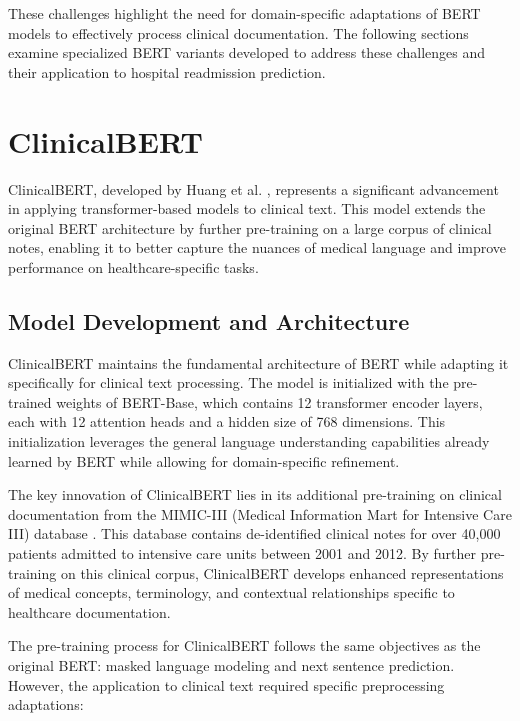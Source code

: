 \documentclass[3p,times,procedia]{elsarticle}
\begin{document}
These challenges highlight the need for domain-specific adaptations of BERT models to effectively process clinical documentation. The following sections examine specialized BERT variants developed to address these challenges and their application to hospital readmission prediction.

\section{ClinicalBERT}\label{clinical_bert}

ClinicalBERT, developed by Huang et al. \cite{Huang2020}, represents a significant advancement in applying transformer-based models to clinical text. This model extends the original BERT architecture by further pre-training on a large corpus of clinical notes, enabling it to better capture the nuances of medical language and improve performance on healthcare-specific tasks.

\subsection{Model Development and Architecture}

ClinicalBERT maintains the fundamental architecture of BERT while adapting it specifically for clinical text processing. The model is initialized with the pre-trained weights of BERT-Base, which contains 12 transformer encoder layers, each with 12 attention heads and a hidden size of 768 dimensions. This initialization leverages the general language understanding capabilities already learned by BERT while allowing for domain-specific refinement.

The key innovation of ClinicalBERT lies in its additional pre-training on clinical documentation from the MIMIC-III (Medical Information Mart for Intensive Care III) database \cite{Johnson2016}. This database contains de-identified clinical notes for over 40,000 patients admitted to intensive care units between 2001 and 2012. By further pre-training on this clinical corpus, ClinicalBERT develops enhanced representations of medical concepts, terminology, and contextual relationships specific to healthcare documentation.

The pre-training process for ClinicalBERT follows the same objectives as the original BERT: masked language modeling and next sentence prediction. However, the application to clinical text required specific preprocessing adaptations:
\end{document}
